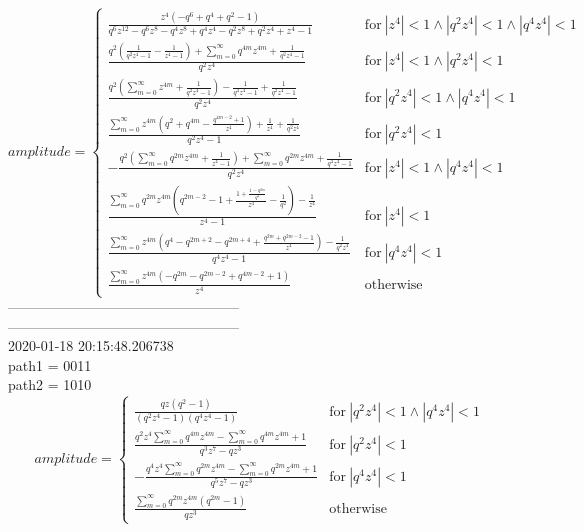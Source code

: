 \documentclass{jsreport}
\begin{document}
$$amplitude = \begin{cases} \frac{z^{4} \left(- q^{6} + q^{4} + q^{2} - 1\right)}{q^{6} z^{12} - q^{6} z^{8} - q^{4} z^{8} + q^{4} z^{4} - q^{2} z^{8} + q^{2} z^{4} + z^{4} - 1} & \text{for}\: \left|{z^{4}}\right| < 1 \wedge \left|{q^{2} z^{4}}\right| < 1 \wedge \left|{q^{4} z^{4}}\right| < 1 \\\frac{q^{2} \left(\frac{1}{q^{2} z^{4} - 1} - \frac{1}{z^{4} - 1}\right) + \sum_{m=0}^{\infty} q^{4 m} z^{4 m} + \frac{1}{q^{2} z^{4} - 1}}{q^{2} z^{4}} & \text{for}\: \left|{z^{4}}\right| < 1 \wedge \left|{q^{2} z^{4}}\right| < 1 \\\frac{q^{2} \left(\sum_{m=0}^{\infty} z^{4 m} + \frac{1}{q^{2} z^{4} - 1}\right) - \frac{1}{q^{4} z^{4} - 1} + \frac{1}{q^{2} z^{4} - 1}}{q^{2} z^{4}} & \text{for}\: \left|{q^{2} z^{4}}\right| < 1 \wedge \left|{q^{4} z^{4}}\right| < 1 \\\frac{\sum_{m=0}^{\infty} z^{4 m} \left(q^{2} + q^{4 m} - \frac{q^{4 m - 2} + 1}{z^{4}}\right) + \frac{1}{z^{4}} + \frac{1}{q^{2} z^{4}}}{q^{2} z^{4} - 1} & \text{for}\: \left|{q^{2} z^{4}}\right| < 1 \\- \frac{q^{2} \left(\sum_{m=0}^{\infty} q^{2 m} z^{4 m} + \frac{1}{z^{4} - 1}\right) + \sum_{m=0}^{\infty} q^{2 m} z^{4 m} + \frac{1}{q^{4} z^{4} - 1}}{q^{2} z^{4}} & \text{for}\: \left|{z^{4}}\right| < 1 \wedge \left|{q^{4} z^{4}}\right| < 1 \\\frac{\sum_{m=0}^{\infty} q^{2 m} z^{4 m} \left(q^{2 m - 2} - 1 + \frac{1 + \frac{1 - q^{2 m}}{q^{2}}}{z^{4}} - \frac{1}{q^{2}}\right) - \frac{1}{z^{4}}}{z^{4} - 1} & \text{for}\: \left|{z^{4}}\right| < 1 \\\frac{\sum_{m=0}^{\infty} z^{4 m} \left(q^{4} - q^{2 m + 2} - q^{2 m + 4} + \frac{q^{2 m} + q^{2 m - 2} - 1}{z^{4}}\right) - \frac{1}{q^{2} z^{4}}}{q^{4} z^{4} - 1} & \text{for}\: \left|{q^{4} z^{4}}\right| < 1 \\\frac{\sum_{m=0}^{\infty} z^{4 m} \left(- q^{2 m} - q^{2 m - 2} + q^{4 m - 2} + 1\right)}{z^{4}} & \text{otherwise} \end{cases}$$
--------------------------------------------------\\
--------------------------------------------------\\
2020-01-18 20:15:48.206738\\
path1 = 0011\\
path2 = 1010\\
$$amplitude = \begin{cases} \frac{q z \left(q^{2} - 1\right)}{\left(q^{2} z^{4} - 1\right) \left(q^{4} z^{4} - 1\right)} & \text{for}\: \left|{q^{2} z^{4}}\right| < 1 \wedge \left|{q^{4} z^{4}}\right| < 1 \\\frac{q^{2} z^{4} \sum_{m=0}^{\infty} q^{4 m} z^{4 m} - \sum_{m=0}^{\infty} q^{4 m} z^{4 m} + 1}{q^{3} z^{7} - q z^{3}} & \text{for}\: \left|{q^{2} z^{4}}\right| < 1 \\- \frac{q^{4} z^{4} \sum_{m=0}^{\infty} q^{2 m} z^{4 m} - \sum_{m=0}^{\infty} q^{2 m} z^{4 m} + 1}{q^{5} z^{7} - q z^{3}} & \text{for}\: \left|{q^{4} z^{4}}\right| < 1 \\\frac{\sum_{m=0}^{\infty} q^{2 m} z^{4 m} \left(q^{2 m} - 1\right)}{q z^{3}} & \text{otherwise} \end{cases}$$
\end{document}
